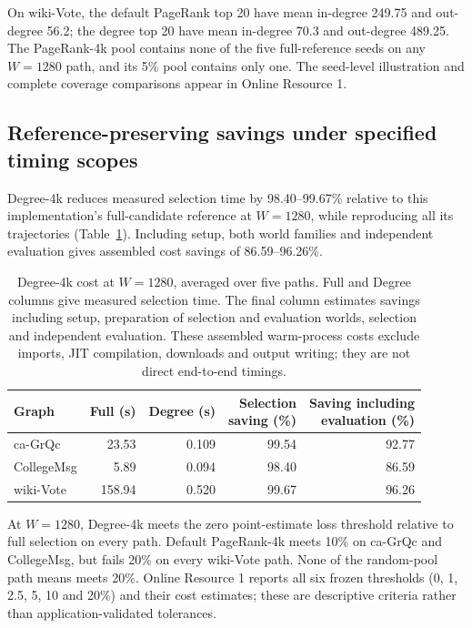 \documentclass[smallextended]{svjour3}
\newcommand{\CollegeDegreeSaving}{86.59}
\newcommand{\WikiDegreeSaving}{96.26}
\begin{document}
On wiki-Vote, the default PageRank top 20 have mean in-degree 249.75 and out-degree 56.2; the degree top 20 have mean in-degree 70.3 and out-degree 489.25. The PageRank-4k pool contains none of the five full-reference seeds on any $W=1280$ path, and its 5\% pool contains only one. The seed-level illustration and complete coverage comparisons appear in Online Resource 1.

\subsection{Reference-preserving savings under specified timing scopes}
Degree-4k reduces measured selection time by 98.40--99.67\% relative to this implementation's full-candidate reference at $W=1280$, while reproducing all its trajectories (Table~\ref{tab:cost}). Including setup, both world families and independent evaluation gives assembled cost savings of \CollegeDegreeSaving{}--\WikiDegreeSaving{}\%.
\begin{table}[htbp]
\caption{Degree-4k cost at $W=1280$, averaged over five paths. Full and Degree columns give measured selection time. The final column estimates savings including setup, preparation of selection and evaluation worlds, selection and independent evaluation. These assembled warm-process costs exclude imports, JIT compilation, downloads and output writing; they are not direct end-to-end timings.}\label{tab:cost}
\begin{tabular}{lrrrr}
\toprule
Graph & Full (s) & Degree (s) & \shortstack{Selection\\saving (\%)} & \shortstack{Saving including\\evaluation (\%)} \\
\midrule
ca-GrQc & 23.53 & 0.109 & 99.54 & 92.77 \\
CollegeMsg & 5.89 & 0.094 & 98.40 & 86.59 \\
wiki-Vote & 158.94 & 0.520 & 99.67 & 96.26 \\
\bottomrule
\end{tabular}
\end{table}


At $W=1280$, Degree-4k meets the zero point-estimate loss threshold relative to full selection on every path. Default PageRank-4k meets 10\% on ca-GrQc and CollegeMsg, but fails 20\% on every wiki-Vote path. None of the random-pool path means meets 20\%. Online Resource 1 reports all six frozen thresholds (0, 1, 2.5, 5, 10 and 20\%) and their cost estimates; these are descriptive criteria rather than application-validated tolerances.
\end{document}
